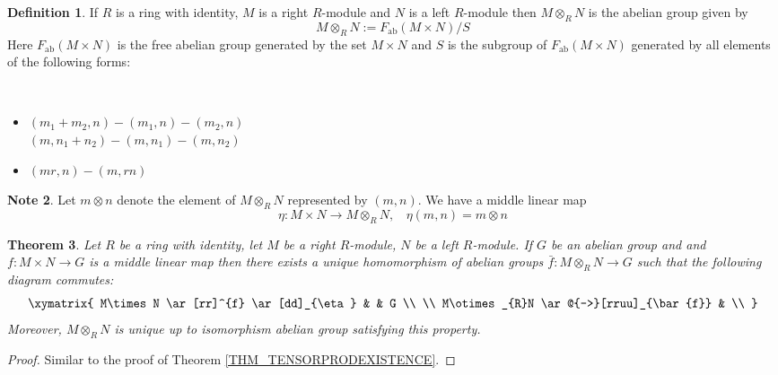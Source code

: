 \documentclass[12pt, letterpaper, oneside]{article}
\theoremstyle{plain}
\newtheorem{theorem}{Theorem}[section]
\theoremstyle{definition}
\newtheorem{definition}[theorem]{Definition}
\newtheorem{note}[theorem]{Note}
\newcommand{\bit}{\begin{itemize}}
\newcommand{\eit}{\end{itemize}}
\newcommand{\vs}{\vskip 5mm}
\begin{document}
\vs\vs

\begin{definition}
If $R$ is a ring with identity, $M$ is a right $R$-module and $N$ is a left $R$-module then 
$M\otimes_{R}N$ is the abelian group given by
$$M\otimes_{R}N := F_{\text{ab}}(M\times N)/S$$
Here $F_{\text{ab}}(M\times N)$ is the free abelian group generated by the set $M\times N$ and 
$S$ is the subgroup of $F_{\text{ab}}(M\times N)$ generated by all elements of the following forms:

\vskip -13mm

\ 
\bit
\item[(i)] $(m_{1}+ m_{2}, n) - (m_{1}, n) - (m_{2}, n)$ \\
$(m,  n_{1} + n_{2}) - (m, n_{1}) - (m, n_{2})$
\item[(ii)] $(mr, n) - (m, rn)$ \\

\eit

\end{definition}


\vs

\begin{note}
Let $m\otimes n$ denote the element of $M\otimes_{R}N$ represented by $(m, n)$. We have a 
middle linear map 
$$\eta \colon M\times N \to M\otimes_{R}N, \ \ \ \ \eta(m, n) = m\otimes n$$
\end{note}


\vs\vs


\begin{theorem}
Let $R$ be a ring with identity, let $M$ be a right $R$-module, $N$ be a left 
$R$-module. If $G$ be an abelian group and 
and $f\colon M\times N \to G$ is a middle linear map then 
there exists a unique homomorphism of abelian groups  $\bar f\colon M\otimes_{R}N \to G$ 
such that the following diagram commutes:
$$
\xymatrix{
M\times N \ar[rr]^{f} \ar[dd]_{\eta} & & G \\
\\
M\otimes_{R}N \ar@{-->}[rruu]_{\bar{f}} & \\
}
$$
Moreover,   $M\otimes_{R}N$ is unique up to isomorphism abelian group satisfying this property. 
\end{theorem}


\vs

\begin{proof}
Similar to the proof of Theorem \ref{THM_TENSORPRODEXISTENCE}.
\end{proof}
\end{document}
